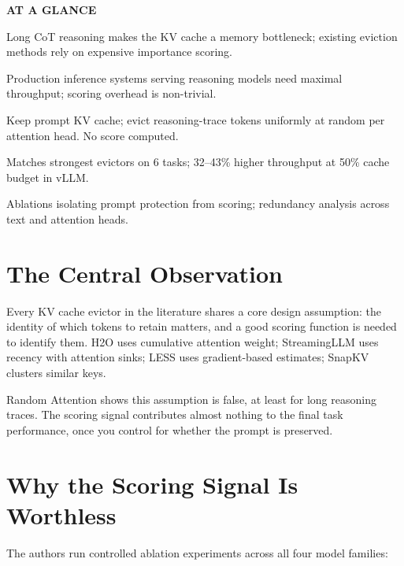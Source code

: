 \documentclass[10pt,twocolumn]{article}
\begin{document}
\begin{mdframed}[backgroundcolor=boxgray,linecolor=rulered,linewidth=1pt,
    innerleftmargin=6pt,innerrightmargin=6pt,
    innertopmargin=6pt,innerbottommargin=6pt]
\textbf{\small AT A GLANCE}\par\vspace{4pt}
\begin{description}[leftmargin=0pt,labelsep=4pt,itemsep=2pt,parsep=0pt,
    font=\small\bfseries]
  \item[Problem:] Long CoT reasoning makes the KV cache a memory
    bottleneck; existing eviction methods rely on expensive importance
    scoring.
  \item[Why it matters:] Production inference systems serving reasoning
    models need maximal throughput; scoring overhead is non-trivial.
  \item[Method:] Keep prompt KV cache; evict reasoning-trace tokens
    uniformly at random per attention head. No score computed.
  \item[Result:] Matches strongest evictors on 6 tasks; 32--43\%
    higher throughput at 50\% cache budget in vLLM.
  \item[Evidence:] Ablations isolating prompt protection from scoring;
    redundancy analysis across text and attention heads.
\end{description}
\end{mdframed}

\section{The Central Observation}

Every KV cache evictor in the literature shares a core design assumption:
the identity of which tokens to retain matters, and a good scoring
function is needed to identify them. H2O uses cumulative attention
weight; StreamingLLM uses recency with attention sinks; LESS uses
gradient-based estimates; SnapKV clusters similar keys.

Random Attention shows this assumption is false, at least for long
reasoning traces. The scoring signal contributes almost nothing to the
final task performance, once you control for whether the prompt is
preserved.

\section{Why the Scoring Signal Is Worthless}

The authors run controlled ablation experiments across all four model
families:
\end{document}
